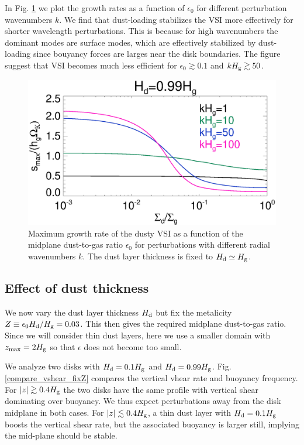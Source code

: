 In Fig. \ref{vsi_dust_loading_vareps} we plot the growth rates as a
function of $\epsilon_0$ for different perturbation wavenumbers $k$. We
find that dust-loading stabilizes the VSI more effectively for shorter
wavelength perturbations. This is because for high wavenumbers the
dominant modes are surface modes, which are effectively stabilized by
dust-loading since bouyancy forces are larges near the disk
boundaries. The figure suggest that VSI becomes much less efficient
for $\epsilon_0\gtrsim 0.1$ and $kH_\mathrm{g}\gtrsim 50$. 

\begin{figure}
  \includegraphics[width=\linewidth]{figures/compare_eigenvals_vareps2} 
  \caption{Maximum growth rate of the dusty VSI as a function of the
    midplane dust-to-gas ratio $\epsilon_0$ for perturbations with
    different radial wavenumbers $k$. The dust layer thickness is
    fixed to $H_\mathrm{d}\simeq H_\mathrm{g}$. 
    \label{vsi_dust_loading_vareps}
    }
\end{figure}




\subsection{Effect of dust thickness} 
We now vary the dust layer thickness $H_\mathrm{d}$ but fix the metalicity 
$Z \equiv \epsilon_0 H_\mathrm{d}/H_\mathrm{g} = 0.03$. This then gives the
required midplane dust-to-gas ratio. Since we will consider thin dust
layers, here we use a smaller 
domain with $z_\mathrm{max}=2H_\mathrm{g}$ so that $\epsilon$ does not become
too small. 

We analyze two disks with $H_\mathrm{d}=0.1H_\mathrm{g}$ and 
$H_\mathrm{d}=0.99H_\mathrm{g}$. Fig. \ref{compare_vshear_fixZ} compares the vertical
vhear rate and buoyancy frequency. For $|z|\gtrsim 0.4H_\mathrm{g}$ the two
disks have the same profile with vertical shear dominating over
buoyancy. We thus expect perturbations away from the disk midplane in 
both cases. For $|z|\lesssim 0.4H_\mathrm{g}$, a thin dust 
layer with $H_\mathrm{d}=0.1H_\mathrm{g}$ boosts the vertical shear rate, but the
associated buoyancy is larger still, implying the mid-plane should be
stable. 

